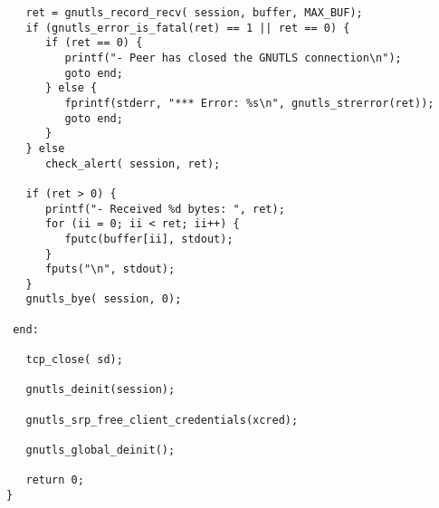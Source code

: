 \begin{verbatim}
   ret = gnutls_record_recv( session, buffer, MAX_BUF);
   if (gnutls_error_is_fatal(ret) == 1 || ret == 0) {
      if (ret == 0) {
         printf("- Peer has closed the GNUTLS connection\n");
         goto end;
      } else {
         fprintf(stderr, "*** Error: %s\n", gnutls_strerror(ret));
         goto end;
      }
   } else
      check_alert( session, ret);

   if (ret > 0) {
      printf("- Received %d bytes: ", ret);
      for (ii = 0; ii < ret; ii++) {
         fputc(buffer[ii], stdout);
      }
      fputs("\n", stdout);
   }
   gnutls_bye( session, 0);

 end:

   tcp_close( sd);

   gnutls_deinit(session);

   gnutls_srp_free_client_credentials(xcred);

   gnutls_global_deinit();

   return 0;
}

\end{verbatim}

